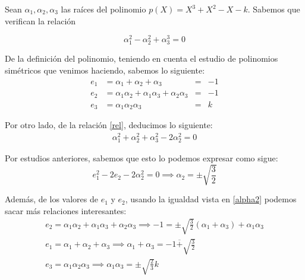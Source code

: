 \documentclass[a4paper, 11pt]{article}
\begin{document}
  \begin{solucion}
      Sean $\alpha_1, \alpha_2, \alpha_3$ las raíces del polinomio $p(X)=X^3+X^2-X-k$. Sabemos que verifican la relación

      \begin{equation} \label{rel}
          \alpha_1^2-\alpha_2^2+\alpha_3^3 = 0
      \end{equation}

      De la definición del polinomio, teniendo en cuenta el estudio de polinomios simétricos que venimos haciendo, sabemos lo siguiente:
      \begin{align*}
          e_1 &= \alpha_1+\alpha_2+\alpha_3 &=& -1 \\
          e_2 &= \alpha_1\alpha_2 + \alpha_1\alpha_3 + \alpha_2\alpha_3 &=& -1 \\
          e_3 &= \alpha_1\alpha_2\alpha_3 &=& k
      \end{align*}

      Por otro lado, de la relación \ref{rel}, deducimos lo siguiente:
      \begin{align*}
          \alpha_1^2+\alpha_2^2+\alpha_3^2 - 2\alpha_2^2 = 0
      \end{align*}

      Por estudios anteriores, sabemos que esto lo podemos expresar como sigue:
      \begin{equation} \label{alpha2}
        e_1^2-2e_2 - 2\alpha_2^2 = 0 \implies \boxed{\alpha_2 = \pm\sqrt{\frac{3}{2}}}
      \end{equation}

      Además, de los valores de $e_1$ y $e_2$, usando la igualdad vista en \ref{alpha2} podemos sacar más relaciones interesantes:
      \begin{align}
          e_2 = \alpha_1\alpha_2 + \alpha_1\alpha_3 + \alpha_2\alpha_3 \implies \boxed{-1 = \pm\sqrt{\frac{3}{2}}(\alpha_1+\alpha_3)+\alpha_1\alpha_3} \label{total}\\
          e_1 = \alpha_1 + \alpha_2 + \alpha_3 \implies \boxed{\alpha_1 + \alpha_3 = -1 \overline{+}\sqrt{\frac{3}{2}}} \label{suma}\\
          e_3 = \alpha_1\alpha_2\alpha_3 \implies \boxed{\alpha_1\alpha_3 = \pm\sqrt{\frac{2}{3}}k}\label{producto}
      \end{align}


\end{solucion}
\end{document}
